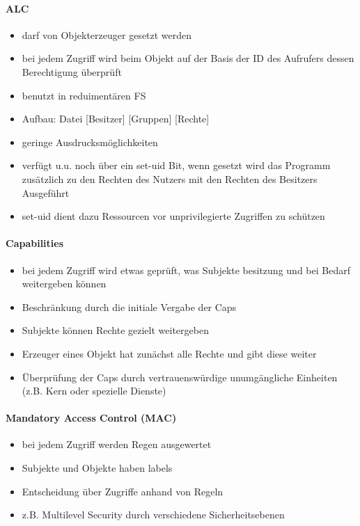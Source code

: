 \documentclass[12pt,a4paper]{article}
\begin{document}
\paragraph{ALC}
\flushleft
\begin{itemize}
\item darf von Objekterzeuger gesetzt werden
\item bei jedem Zugriff wird beim Objekt auf der Basis der ID des Aufrufers dessen Berechtigung überprüft
\item benutzt in reduimentären FS
\item Aufbau: Datei [Besitzer] [Gruppen] [Rechte]
\item geringe Ausdrucksmöglichkeiten
\item verfügt u.u. noch über ein set-uid Bit, wenn gesetzt wird das Programm zusätzlich zu den Rechten des Nutzers mit den Rechten des Besitzers Ausgeführt
\item set-uid dient dazu Ressourcen vor unprivilegierte Zugriffen zu schützen
\end{itemize}
\paragraph{Capabilities}
\flushleft
\begin{itemize}
\item bei jedem Zugriff wird etwas geprüft, was Subjekte besitzung und bei Bedarf weitergeben können
\item Beschränkung durch die initiale Vergabe der Caps
\item Subjekte können Rechte gezielt weitergeben
\item Erzeuger eines Objekt hat zunächst alle Rechte und gibt diese weiter
\item Überprüfung der Caps durch vertrauenswürdige unumgängliche Einheiten (z.B. Kern oder spezielle Dienste)
\end{itemize}
\paragraph{Mandatory Access Control (MAC)}
\flushleft
\begin{itemize}
\item bei jedem Zugriff werden Regen ausgewertet
\item Subjekte und Objekte haben labels 
\item Entscheidung über Zugriffe anhand von Regeln
\item z.B. Multilevel Security durch verschiedene Sicherheitsebenen
\end{itemize}
\end{document}
